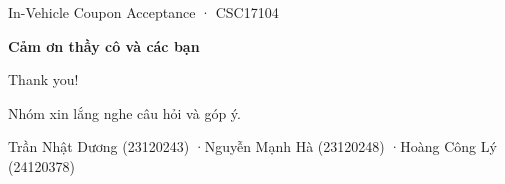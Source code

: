 \documentclass[aspectratio=169,12pt]{beamer}
\begin{document}
\begingroup
{}
\begin{frame}[plain]
  \centering
  \vspace{24mm}
  {\fontsize{18}{23}\selectfont\color{Accent}In-Vehicle Coupon Acceptance · CSC17104\par}
  \vspace{12mm}
  {\fontsize{44}{52}\selectfont\bfseries Cảm ơn thầy cô và các bạn\par}
  \vspace{5mm}
  {\fontsize{24}{30}\selectfont\color{Accent}Thank you!\par}
  \vspace{14mm}
  {\fontsize{18}{24}\selectfont Nhóm xin lắng nghe câu hỏi và góp ý.\par}
  \vspace{12mm}
  {\fontsize{12.5}{16}\selectfont\color{Muted}Trần Nhật Dương (23120243) \quad·\quad Nguyễn Mạnh Hà (23120248) \quad·\quad Hoàng Công Lý (24120378)\par}
\end{frame}
\endgroup
\end{document}
